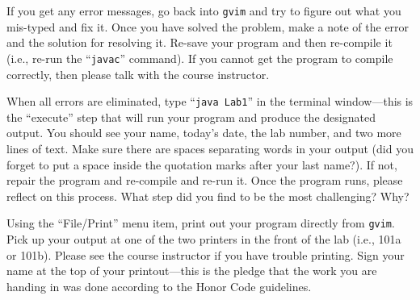 
If you get any error messages, go back into {\tt gvim} and try to figure out what you mis-typed and fix it. Once you
have solved the problem, make a note of the error and the solution for resolving it. Re-save your program and then
re-compile it (i.e., re-run the ``{\tt javac}'' command). If you cannot get the program to compile correctly, then
please talk with the course instructor.

When all errors are eliminated, type ``{\tt java Lab1}'' in the terminal window---this is the ``execute'' step that will run
your program and produce the designated output.  You should see your name, today's date, the lab number, and two more
lines of text. Make sure there are spaces separating words in your output (did you forget to put a space inside the
  quotation marks after your last name?). If not, repair the program and re-compile and re-run it.  Once the program
runs, please reflect on this process.  What step did you find to be the most challenging? Why?




Using the ``File/Print'' menu item, print out your program directly from {\tt gvim}. Pick up your output at one of the
two printers in the front of the lab (i.e., 101a or 101b).  Please see the course instructor if you have trouble
printing.  Sign your name at the top of your printout---this is the pledge that the work you are handing in was done
according to the Honor Code guidelines.

